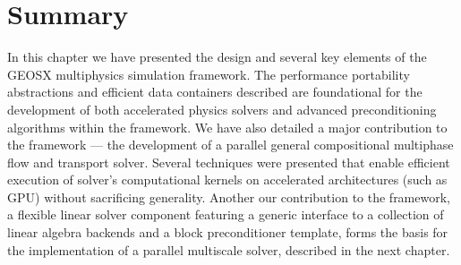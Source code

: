 \section{Summary}
\label{sec:geosx_summary}

In this chapter we have presented the design and several key elements of the GEOSX multiphysics simulation framework.   The performance portability abstractions and efficient data containers described are foundational for the development of both accelerated physics solvers and advanced preconditioning algorithms within the framework.   We have also detailed a major contribution to the framework --- the development of a parallel general compositional multiphase flow and transport solver.   Several techniques were presented that enable efficient execution of solver's computational kernels on accelerated architectures (such as GPU) without sacrificing generality.   Another our contribution to the framework, a flexible linear solver component featuring a generic interface to a collection of linear algebra backends and a block preconditioner template, forms the basis for the implementation of a parallel multiscale solver, described in the next chapter.